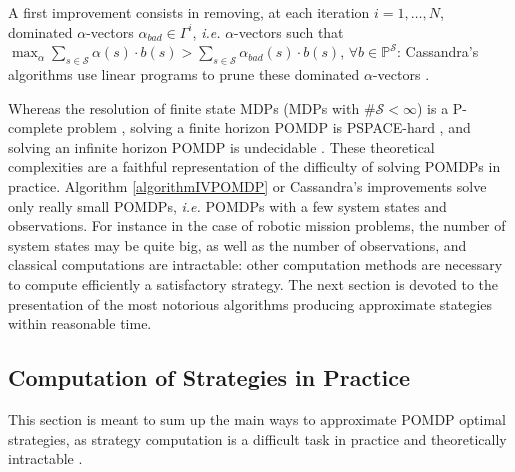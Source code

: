 A first improvement consists in removing, 
at each iteration $i=1,\ldots,N$, 
dominated $\alpha$-vectors $\alpha_{bad} \in \Gamma^i$,
\textit{i.e.} $\alpha$-vectors such that 
$\max_{\alpha} \sum_{s \in \mathcal{S}} \alpha(s) \cdot b(s) > \sum_{s \in \mathcal{S}} \alpha_{bad}(s) \cdot b(s)$, 
$\forall b \in \mathbb{P}^{\mathcal{S}}$: 
Cassandra's algorithms use linear programs 
to prune these dominated $\alpha$-vectors 
\cite{Cassandra:1994:AOP:199480.199520,Cassandra97incrementalpruning}.

Whereas the resolution of finite state MDPs (MDPs with $\# \mathcal{S} < \infty$) is a P-complete problem \cite{Papadimitriou:1987},
solving a finite horizon POMDP is PSPACE-hard \cite{Papadimitriou:1987}, 
and solving an infinite horizon POMDP is undecidable \cite{Madani:1999:UPP:315149.315395}.
These theoretical complexities are a faithful representation of the difficulty of
solving POMDPs in practice. Algorithm \ref{algorithmIVPOMDP} or 
Cassandra's improvements \cite{Cassandra:1994:AOP:199480.199520,Cassandra97incrementalpruning}
solve only really small POMDPs, \textit{i.e.} POMDPs with a few system states and observations.
For instance in the case of robotic mission problems, 
the number of system states may be quite big,
as well as the number of observations,
and classical computations are intractable:
other computation methods are necessary to compute efficiently
a satisfactory strategy. The next section is devoted to the presentation
of the most notorious algorithms producing approximate stategies
within reasonable time.

\subsection{Computation of Strategies in Practice}
\label{section_SAalgo}
This section is meant to sum up the main ways 
to approximate POMDP optimal strategies,
as strategy computation is a difficult task in practice
and theoretically intractable
\cite{Papadimitriou:1987,Madani:1999:UPP:315149.315395}.

